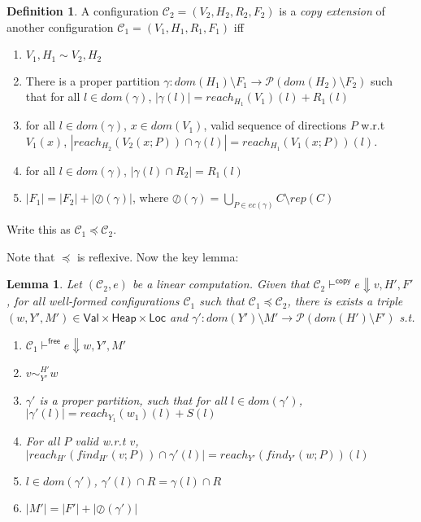 \documentclass{easychair}
\newcommand{\ms}[1]{\ensuremath{\mathsf{#1}}}
\newcommand{\veq}[4]{#3 \sim^{#1}_{#2} #4}
\newcommand{\oh}[1]{\oslash(#1)}
\newtheorem{lemma}[theorem]{Lemma}
\theoremstyle{definition}
\newtheorem{definition}{Definition}
\begin{document}
\begin{definition}
A configuration $\mathcal{C}_2 = (V_2,H_2,R_2,F_2)$ is a \emph{copy extension} of another configuration
$\mathcal{C}_1 = (V_1,H_1,R_1,F_1)$ iff
\begin{enumerate}
\item $V_1,H_1 \sim V_2,H_2$
\item There is a proper partition $\gamma : dom(H_1) \setminus F_1 \to \mathcal{P}(dom(H_2) \setminus F_2)$ 
such that for all $l \in dom(\gamma)$, $|\gamma(l)| = reach_{H_1}(V_1)(l) + R_1(l)$
\item for all $l \in dom(\gamma)$, $x \in dom(V_1)$, valid sequence of directions $P$ w.r.t $V_1(x)$,
	$|reach_{H_2}(V_2(x;P)) \cap \gamma(l)| = reach_{H_1}(V_1(x;P))(l)$.
\item for all $l \in dom(\gamma)$, $|\gamma(l) \cap R_2| = R_1(l)$
\item $|F_1| = |F_2| + |\oh{\gamma}|$, where 
	$\oh{\gamma} = \bigcup_{P \in ec(\gamma)} C \setminus rep(C)$
\end{enumerate}
Write this as $\mathcal{C}_1 \preceq \mathcal{C}_2$.
\end{definition} 

Note that $\preceq$ is reflexive. Now the key lemma:

\begin{lemma}
	Let $(\mathcal{C}_2,e)$ be a linear computation. Given that 
	$\mathcal{C}_2 \vdash^{\mathsf{copy}} e \Downarrow v,H',F'$, 
	for all well-formed configurations $\mathcal{C}_1$ such that $\mathcal{C}_1 \preceq \mathcal{C}_2$,
there is exists a triple
$(w,Y',M') \in \ms{Val} \times \ms{Heap} \times \ms{Loc}$ and 
	$\gamma' : dom(Y') \setminus M' \to \mathcal{P}(dom(H') \setminus F')$ s.t.
	\begin{enumerate}
			\item $\mathcal{C}_1 \vdash^{\mathsf{free}} e \Downarrow w,Y',M'$
			\item $\veq{H'}{Y'}{v}{w}$
			\item $\gamma'$ is a proper partition, such that for all $l \in dom(\gamma')$, 
				$|\gamma'(l)| = reach_{Y_1}(w_1)(l) + S(l)$
			\item For all $P$ valid w.r.t $v$, $|reach_{H'}(find_{H'}(v;P)) \cap \gamma'(l)| = 
				reach_{Y'}(find_{Y'}(w;P))(l)$
			\item $l \in dom(\gamma')$, 
					$\gamma'(l) \cap R = \gamma(l) \cap R$ 
			\item $|M'| = |F'| + |\oh{\gamma'}|$
	\end{enumerate}
\end{lemma}
\end{document}
